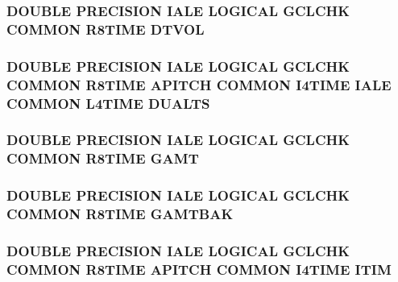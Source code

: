 \hypertarget{time_8com_a087a706518b222edc1a8cb57a895a4b8}{
\subsubsection[{D\-T\-V\-O\-L}]{\setlength{\rightskip}{0pt plus 5cm}D\-O\-U\-B\-L\-E P\-R\-E\-C\-I\-S\-I\-O\-N I\-A\-L\-E L\-O\-G\-I\-C\-A\-L G\-C\-L\-C\-H\-K C\-O\-M\-M\-O\-N R8\-T\-I\-M\-E D\-T\-V\-O\-L}}\label{time_8com_a087a706518b222edc1a8cb57a895a4b8}
\hypertarget{time_8com_ae9c8c0b7bb2bebb11e2e8e8f7c8c86b7}{
\subsubsection[{D\-U\-A\-L\-T\-S}]{\setlength{\rightskip}{0pt plus 5cm}D\-O\-U\-B\-L\-E P\-R\-E\-C\-I\-S\-I\-O\-N I\-A\-L\-E L\-O\-G\-I\-C\-A\-L G\-C\-L\-C\-H\-K C\-O\-M\-M\-O\-N R8\-T\-I\-M\-E {\bf A\-P\-I\-T\-C\-H} C\-O\-M\-M\-O\-N I4\-T\-I\-M\-E I\-A\-L\-E C\-O\-M\-M\-O\-N L4\-T\-I\-M\-E D\-U\-A\-L\-T\-S}}\label{time_8com_ae9c8c0b7bb2bebb11e2e8e8f7c8c86b7}
\hypertarget{time_8com_afdf546d0ac261dc8969599f6c2786ea3}{
\subsubsection[{G\-A\-M\-T}]{\setlength{\rightskip}{0pt plus 5cm}D\-O\-U\-B\-L\-E P\-R\-E\-C\-I\-S\-I\-O\-N I\-A\-L\-E L\-O\-G\-I\-C\-A\-L G\-C\-L\-C\-H\-K C\-O\-M\-M\-O\-N R8\-T\-I\-M\-E G\-A\-M\-T}}\label{time_8com_afdf546d0ac261dc8969599f6c2786ea3}
\hypertarget{time_8com_a25bf5617cd66a62825fec4d14e7f4023}{
\subsubsection[{G\-A\-M\-T\-B\-A\-K}]{\setlength{\rightskip}{0pt plus 5cm}D\-O\-U\-B\-L\-E P\-R\-E\-C\-I\-S\-I\-O\-N I\-A\-L\-E L\-O\-G\-I\-C\-A\-L G\-C\-L\-C\-H\-K C\-O\-M\-M\-O\-N R8\-T\-I\-M\-E G\-A\-M\-T\-B\-A\-K}}\label{time_8com_a25bf5617cd66a62825fec4d14e7f4023}
\hypertarget{time_8com_a05b1a0581c155d7e49853c3808fe94c9}{
\subsubsection[{I\-T\-I\-M}]{\setlength{\rightskip}{0pt plus 5cm}D\-O\-U\-B\-L\-E P\-R\-E\-C\-I\-S\-I\-O\-N I\-A\-L\-E L\-O\-G\-I\-C\-A\-L G\-C\-L\-C\-H\-K C\-O\-M\-M\-O\-N R8\-T\-I\-M\-E {\bf A\-P\-I\-T\-C\-H} C\-O\-M\-M\-O\-N I4\-T\-I\-M\-E I\-T\-I\-M}}\label{time_8com_a05b1a0581c155d7e49853c3808fe94c9}
